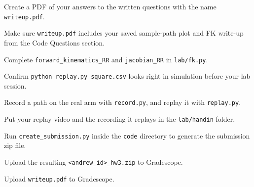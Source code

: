 \documentclass{16384_doc}
\begin{document}
\begin{submissionChecklist}
			\item Create a PDF of your answers to the written questions with the name \verb!writeup.pdf!.
		\item Make sure \verb!writeup.pdf! includes your saved sample-path plot and FK write-up from the Code Questions section.
		\item Complete \verb!forward_kinematics_RR! and \verb!jacobian_RR! in \verb!lab/fk.py!.
		\item Confirm \verb!python replay.py square.csv! looks right in simulation before your lab session.
		\item Record a path on the real arm with \verb!record.py!, and replay it with \verb!replay.py!.
		\item Put your replay video and the recording it replays in the \verb!lab/handin! folder.
		\item Run \verb!create_submission.py! inside the \verb!code! directory to generate the submission zip file.
		\item Upload the resulting \verb!<andrew_id>_hw3.zip! to Gradescope.
		\item Upload \verb!writeup.pdf! to Gradescope.
	\end{submissionChecklist}
\end{document}
